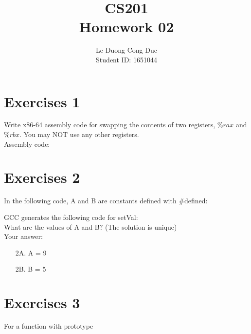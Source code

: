 \documentclass[a4paper,12pt]{article}
\begin{document}
\author{Le Duong Cong Duc \\ Student ID: 1651044}
\title{CS201\\Homework 02}
\maketitle


\setcounter{page}{1}
\tableofcontents
{}

\clearpage


\section{Exercises 1}

Write x86-64 assembly code for swapping the contents of two registers, $\%rax$ and $\%rbx$. You may NOT use any other registers. \\[1cm]

Assembly code:



\section{Exercises 2}
In the following code, A and B are constants defined with \#defined:



GCC generates the following code for setVal: \\[0.3cm]



What are the values of A and B? (The solution is unique)\\[0.5cm]

Your answer:
\begin{enumerate}
\item[2A.] A = 9 %
\item[2B.] B = 5 %
\end{enumerate}

\section{Exercises 3}
For a function with prototype


\end{document}
